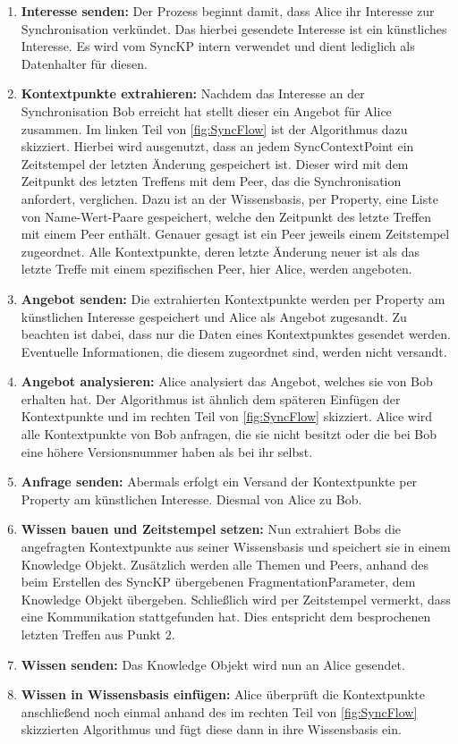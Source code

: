 \documentclass[a4paper]{article}
\begin{document}
	\begin{enumerate}
		\item \textbf{Interesse senden:} Der Prozess beginnt damit, dass Alice
		ihr Interesse zur Synchronisation verkündet. Das hierbei gesendete
		Interesse ist ein künstliches Interesse. Es wird vom SyncKP intern
		verwendet und dient lediglich als Datenhalter für diesen.
		\item \textbf{Kontextpunkte extrahieren:} Nachdem das Interesse an der
		Synchronisation Bob erreicht hat stellt dieser ein Angebot für Alice
		zusammen. Im linken Teil von \autoref{fig:SyncFlow} ist der
		Algorithmus dazu skizziert. Hierbei wird ausgenutzt, dass an jedem
		SyncContextPoint ein Zeitstempel der letzten Änderung gespeichert ist.
		Dieser wird mit dem Zeitpunkt des letzten Treffens mit dem Peer,
		das die Synchronisation anfordert, verglichen. Dazu ist an der
		Wissensbasis, per Property, eine Liste von Name-Wert-Paare gespeichert, 
		welche den Zeitpunkt des letzte Treffen mit einem Peer enthält.
		Genauer gesagt ist ein Peer jeweils einem Zeitstempel zugeordnet. Alle
		Kontextpunkte, deren letzte Änderung neuer ist als das letzte Treffe mit
		einem spezifischen Peer, hier Alice, werden angeboten.
		\item \textbf{Angebot senden:} Die extrahierten Kontextpunkte werden per
		Property am künstlichen Interesse gespeichert und Alice als Angebot
		zugesandt. Zu beachten	ist dabei, dass nur die Daten eines Kontextpunktes
		gesendet werden. Eventuelle Informationen, die diesem zugeordnet sind,
		werden nicht versandt.
		\item \textbf{Angebot analysieren:} Alice analysiert das Angebot, welches
		sie von Bob erhalten hat. Der Algorithmus ist ähnlich dem späteren Einfügen
		der Kontextpunkte und im rechten Teil von \autoref{fig:SyncFlow}
		skizziert. Alice wird alle Kontextpunkte von Bob anfragen, die sie
		nicht besitzt oder die bei Bob eine höhere Versionsnummer haben als
		bei ihr selbst.
		\item \textbf{Anfrage senden:} Abermals erfolgt ein Versand der
		Kontextpunkte per Property am künstlichen Interesse. Diesmal von Alice 
		zu Bob.
		\newpage
		\item \textbf{Wissen bauen und Zeitstempel setzen:} Nun extrahiert Bobs die
		angefragten	Kontextpunkte aus seiner Wissensbasis und speichert sie in einem
		Knowledge Objekt. Zusätzlich werden	alle Themen und Peers,
		anhand des beim Erstellen des SyncKP übergebenen FragmentationParameter,
		dem Knowledge Objekt übergeben. Schließlich wird per Zeitstempel vermerkt,
		dass eine Kommunikation stattgefunden hat. Dies entspricht dem
		besprochenen letzten Treffen aus Punkt 2.
		\item \textbf{Wissen senden:} Das Knowledge Objekt wird nun an Alice
		gesendet.
		\item \textbf{Wissen in Wissensbasis einfügen:} Alice überprüft 
		die Kontextpunkte anschließend noch einmal anhand des im rechten Teil von
		\autoref{fig:SyncFlow} skizzierten Algorithmus und fügt diese dann in
		ihre Wissensbasis ein.
	\end{enumerate} 	
	
\end{document}
